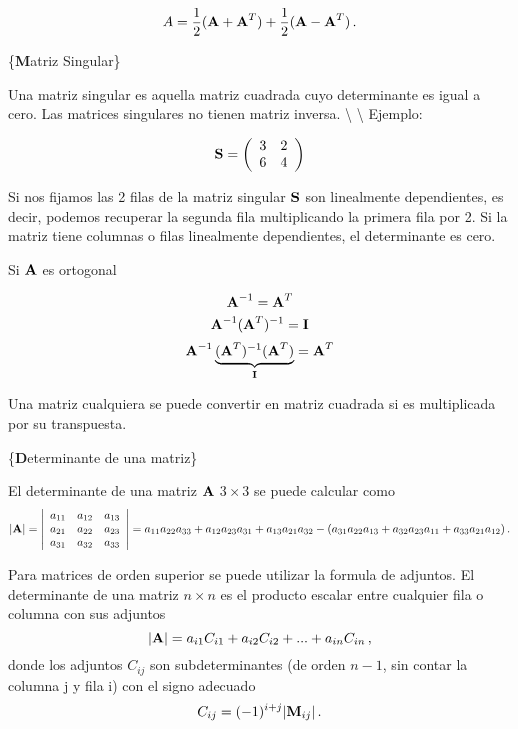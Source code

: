 \documentclass[
]{agujournal2019}
\begin{document}
\[A=\frac{1}{2}({\textbf A}+{\textbf A}^T) + \frac{1}{2}({\textbf A}-{\textbf A}^T)\,.\]

\vspace{0.5cm}

\{\noindent \textbf Matriz Singular\}

Una matriz singular es aquella matriz cuadrada cuyo determinante es
igual a cero. Las matrices singulares no tienen matriz inversa.
\textbackslash{} \textbackslash{} Ejemplo:

\[{\textbf S}=\left(\begin{array}{cc}
  3 & 2\\
  6 & 4
\end{array}\right)
\]

Si nos fijamos las 2 filas de la matriz singular \({\textbf S}\) son
linealmente dependientes, es decir, podemos recuperar la segunda fila
multiplicando la primera fila por 2. Si la matriz tiene columnas o filas
linealmente dependientes, el determinante es cero.

Si \({\textbf A}\) es ortogonal

\[{\textbf A}^{-1}={\textbf A}^T\]
\[{\textbf A}^{-1}({\textbf A}^T)^{-1}={\textbf I}\]
\[{\textbf A}^{-1}\underbrace{({\textbf A}^T)^{-1}({\textbf A}^T)}_{{\textbf I}}={\textbf A}^T\]

Una matriz cualquiera se puede convertir en matriz cuadrada si es
multiplicada por su transpuesta.

\vspace{0.5cm}

\{\noindent \textbf Determinante de una matriz\}

\noindent El determinante de una matriz \({\textbf A}\) \(3\times 3\) se
puede calcular como \[|{\textbf A}|=\left|\begin{array}{cccc}
  a_{11} & a_{12} & a_{13}\\
  a_{21} & a_{22} & a_{23}\\
  a_{31} & a_{32} & a_{33}\\
\end{array}
  \right|=a_{11}a_{22}a_{33} + a_{12}a_{23}a_{31} + a_{13}a_{21}a_{32}-(a_{31}a_{22}a_{13} + a_{32}a_{23}a_{11} +
          a_{33}a_{21}a_{12})\,.\]

Para matrices de orden superior se puede utilizar la formula de
adjuntos. El determinante de una matriz \(n\times n\) es el producto
escalar entre cualquier fila o columna con sus adjuntos
\[|{\textbf A}|=a_{i1}C_{i1} + a_{i2}C_{i2}+...+a_{in}C_{in}\,,\] donde
los adjuntos \(C_{ij}\) son subdeterminantes (de orden \(n-1\), sin
contar la columna j y fila i) con el signo adecuado
\[C_{ij}=(-1)^{i+j}|{\textbf M}_{ij}|\,.\]
\end{document}
